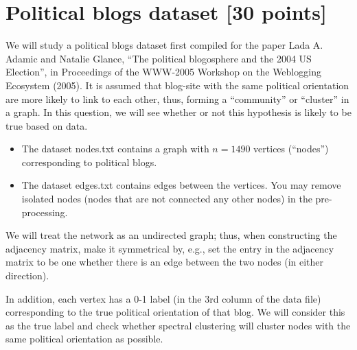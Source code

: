 \documentclass[twoside,10pt]{article}
\begin{document}
\section{Political blogs dataset [30 points]}

We will study a political blogs dataset first compiled for the paper Lada A. Adamic and Natalie Glance, ``The political blogosphere and the 2004 US Election'', in Proceedings of the WWW-2005 Workshop on the Weblogging Ecosystem (2005). It is assumed that blog-site with the same political orientation are more likely to link to each other, thus, forming a ``community'' or ``cluster'' in a graph. In this question, we will see whether or not this hypothesis is likely to be true based on data.
\begin{itemize}

\item The dataset \textsf{nodes.txt} contains a graph with $n = 1490$ vertices (``nodes'') corresponding to political blogs. 

\item The dataset \textsf{edges.txt} contains edges between the vertices. You may remove isolated nodes (nodes that are not connected any other nodes) in the pre-processing. 

\end{itemize}

We will treat the network as an undirected graph; thus, when constructing the adjacency matrix, make it symmetrical by, e.g., set the entry in the adjacency matrix to be one whether there is an edge between the two nodes (in either direction). 

In addition, each vertex has a 0-1 label (in the 3rd column of the data file) corresponding to the true political orientation of that blog. We will consider this as the true label and check whether spectral clustering will cluster nodes with the same political orientation as possible. 
\end{document}
